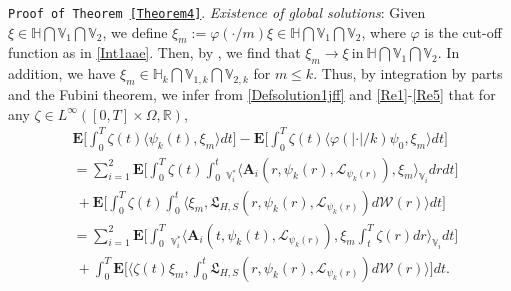 \documentclass[11pt]{article}
\renewcommand{\leq}{\leqslant}
\numberwithin{equation}{section}
\begin{document}
\texttt{Proof of Theorem \ref{Theorem4}}.
\emph{Existence of global solutions}:
 Given $\xi\in \mathbb{H}\bigcap\mathbb{V}_1
\bigcap\mathbb{V}_2$,
we define $\xi_{m}:=\varphi(\cdot/m)\xi\in \mathbb{H}\bigcap\mathbb{V}_1
\bigcap\mathbb{V}_2$,
where $\varphi$ is the cut-off function as in \eqref{Int1aae}. Then, by \cite{Wang-wangb,RWangsubmitted}, we find that $\xi_m\rightarrow \xi \ \mbox{in}\ \mathbb{H}\bigcap\mathbb{V}_1
\bigcap\mathbb{V}_2$.
In addition, we have $\xi_m\in\mathbb{H}_k\bigcap\mathbb{V}_{1,k}
\bigcap\mathbb{V}_{2,k}$ for $m\leq k$.
Thus, by integration by parts and
the	Fubini theorem, we infer from \eqref{Defsolution1jff} and \eqref{Re1}-\eqref{Re5} that for any $\zeta\in L^\infty([0,T]
	\times\Omega,\mathbb{R})$,
	\begin{align}\label{Desyfsolutjk;jion25djdjd}
		& \mathbf{E}
		\bigg[\int_{0}^{T}\zeta(t)\langle \psi_k(t) ,\xi_m\rangle dt\bigg]-
		\mathbf{E}
		\bigg[\int_{0}^{T}\zeta(t) \langle
		\varphi(|\cdot|/k)\psi_0 ,\xi_m\rangle dt\bigg]
		\nonumber\\&=
		\sum_{i=1}^2\mathbf{E}
		\bigg[\int_{0}^{T}\zeta(t) \int_{0}^t\
		_{\mathbb{V}_i^*}\langle \mathbf{A}_i(r,\psi_k(r),\mathcal{L}_{\psi_k(r)}) ,\xi_m\rangle_{\mathbb{V}_i}
	dr dt\bigg]
\nonumber\\&\   +\mathbf{E}
		\bigg[\int_{0}^{T}\zeta(t)
\int_{0}^t
		\big\langle \xi_m, \mathfrak{L}_{H,S}(r,\psi_k(r),\mathcal{L}_{\psi_k(r)})d\mathcal{W}(r) \big\rangle dt\bigg]
		\nonumber\\&=\sum_{i=1}^2
		\mathbf{E}
		\bigg[\int_{0}^{T}
		\ _{\mathbb{V}_i^*}\Big\langle \mathbf{A}_i(t,\psi_k(t),\mathcal{L}_{\psi_k(r)}) ,\xi_m\int_{t}^{T}
		\zeta(r)dr\Big\rangle_{\mathbb{V}_i}dt\bigg]
		\nonumber\\&\   +\int_{0}^{T}
		\mathbf{E}
		\bigg[
		\Big\langle \zeta(t)\xi_m, \int_{0}^t\mathfrak{L}_{H,S}(r,\psi_k(r),
\mathcal{L}_{\psi_k(r)})d\mathcal{W}(r) \Big\rangle\bigg]
		dt.
	\end{align}
\end{document}
